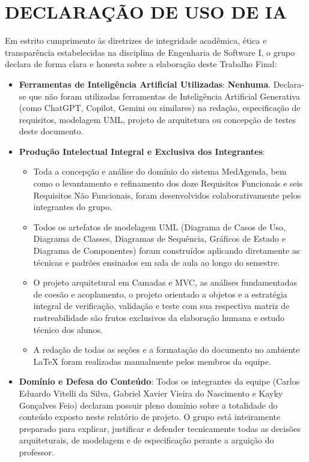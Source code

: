 \section{DECLARAÇÃO DE USO DE IA}

Em estrito cumprimento às diretrizes de integridade acadêmica, ética e transparência estabelecidas na disciplina de Engenharia de Software I, o grupo declara de forma clara e honesta sobre a elaboração deste Trabalho Final:

\begin{itemize}
    \item \textbf{Ferramentas de Inteligência Artificial Utilizadas}: \textbf{Nenhuma}. Declara-se que não foram utilizadas ferramentas de Inteligência Artificial Generativa (como ChatGPT, Copilot, Gemini ou similares) na redação, especificação de requisitos, modelagem UML, projeto de arquitetura ou concepção de testes deste documento.
    
    \item \textbf{Produção Intelectual Integral e Exclusiva dos Integrantes}:
    \begin{itemize}
        \item Toda a concepção e análise do domínio do sistema MedAgenda, bem como o levantamento e refinamento dos doze Requisitos Funcionais e seis Requisitos Não Funcionais, foram desenvolvidos colaborativamente pelos integrantes do grupo.
        \item Todos os artefatos de modelagem UML (Diagrama de Casos de Uso, Diagrama de Classes, Diagramas de Sequência, Gráficos de Estado e Diagrama de Componentes) foram construídos aplicando diretamente as técnicas e padrões ensinados em sala de aula ao longo do semestre.
        \item O projeto arquitetural em Camadas e MVC, as análises fundamentadas de coesão e acoplamento, o projeto orientado a objetos e a estratégia integral de verificação, validação e teste com sua respectiva matriz de rastreabilidade são frutos exclusivos da elaboração humana e estudo técnico dos alunos.
        \item A redação de todas as seções e a formatação do documento no ambiente LaTeX foram realizadas manualmente pelos membros da equipe.
    \end{itemize}
    
    \item \textbf{Domínio e Defesa do Conteúdo}: Todos os integrantes da equipe (Carlos Eduardo Vitelli da Silva, Gabriel Xavier Vieira do Nascimento e Kayky Gonçalves Feio) declaram possuir pleno domínio sobre a totalidade do conteúdo exposto neste relatório de projeto. O grupo está inteiramente preparado para explicar, justificar e defender tecnicamente todas as decisões arquiteturais, de modelagem e de especificação perante a arguição do professor.
\end{itemize}
